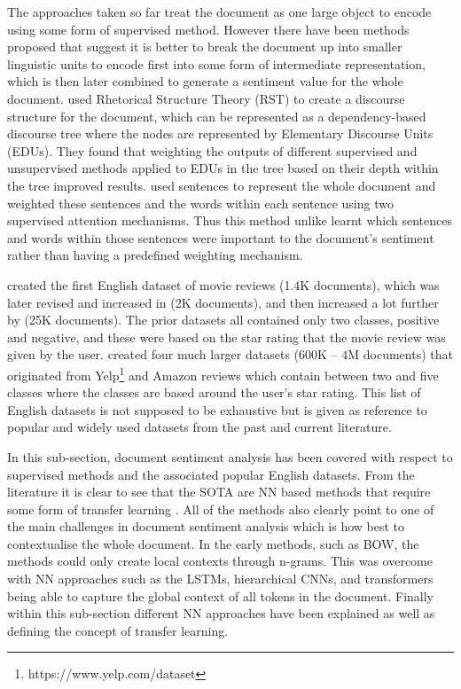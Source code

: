 The approaches taken so far treat the document as one large object to encode using some form of supervised method. However there have been methods proposed that suggest it is better to break the document up into smaller linguistic units to encode first into some form of intermediate representation, which is then later combined to generate a sentiment value for the whole document. \citet{bhatia-etal-2015-better} used Rhetorical Structure Theory (RST) \citep{mann-1984-discourse} to create a discourse structure for the document, which can be represented as a dependency-based discourse tree where the nodes are represented by Elementary Discourse Units (EDUs). They found that weighting the outputs of different supervised and unsupervised methods applied to EDUs in the tree based on their depth within the tree improved results. \citet{yang-etal-2016-hierarchical} used sentences to represent the whole document and weighted these sentences and the words within each sentence using two supervised attention mechanisms. Thus this method unlike \citet{bhatia-etal-2015-better} learnt which sentences and words within those sentences were important to the document's sentiment rather than having a predefined weighting mechanism.

\citet{pang-etal-2002-thumbs} created the first English dataset of movie reviews (1.4K documents), which was later revised and increased in \citet{pang-lee-2004-sentimental} (2K documents), and then increased a lot further by \citet{maas-etal-2011-learning} (25K documents). The prior datasets all contained only two classes, positive and negative, and these were based on the star rating that the movie review was given by the user. \citet{zhang2015character} created four much larger datasets ($600$K -- $4$M documents) that originated from Yelp\footnote{https://www.yelp.com/dataset} and Amazon reviews \citep{mcauley2015image} which contain between two and five classes where the classes are based around the user's star rating. This list of English datasets is not supposed to be exhaustive but is given as reference to popular and widely used datasets from the past and current literature.

In this sub-section, document sentiment analysis has been covered with respect to supervised methods and the associated popular English datasets. From the literature it is clear to see that the SOTA are NN based methods that require some form of transfer learning \citep{yang2019xlnet}. All of the methods also clearly point to one of the main challenges in document sentiment analysis which is how best to contextualise the whole document. In the early methods, such as BOW, the methods could only create local contexts through n-grams. This was overcome with NN approaches such as the LSTMs, hierarchical CNNs, and transformers being able to capture the global context of all tokens in the document. Finally within this sub-section different NN approaches have been explained as well as defining the concept of transfer learning.

